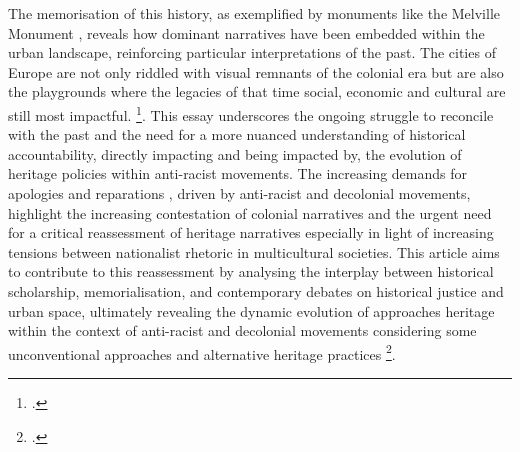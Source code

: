\documentclass{scrartcl}
\renewcommand{\cite}{\parencite}
\begin{document}
The memorisation of this history, as exemplified by monuments like the Melville Monument , reveals how dominant narratives have been embedded within the urban landscape, reinforcing particular interpretations of the past. The cities of Europe are not only riddled with visual remnants of the colonial era but are also the playgrounds where the legacies of that time social, economic and cultural are still most impactful.   \footcite["While in some cityscapes – often those of European metropoles – the challenge is to sufficiently evoke a colonial past effectively repressed or erased from the collective memory, in other cities – as is well illustrated in the article by Joffre and Shepherd on Cape Town – the echoes of past atrocities and the ghosts of individuals enslaved, abused or murdered are everywhere present." 
][p.4]{kolvraa_decolonizing_2020}. 
This essay  underscores the ongoing struggle to reconcile with the past and the need for a more nuanced understanding of historical accountability, directly impacting and being impacted by, the evolution of heritage policies within anti-racist movements.
The increasing demands for apologies and reparations \cite{hartel_2024}, driven by anti-racist and decolonial movements, highlight the increasing contestation of colonial narratives and the urgent need for a critical reassessment of heritage narratives especially in light of increasing tensions between nationalist rhetoric in multicultural societies. This article aims to contribute to this reassessment by analysing the interplay between historical scholarship, memorialisation, and contemporary debates on historical justice and urban space, ultimately revealing the dynamic evolution of approaches heritage within the context of anti-racist and decolonial movements  considering some unconventional approaches and alternative heritage practices \footcite[this would imply a rethinking of the interface between information and aesthetics in the symbolic representation of past atrocities: If – as is illustrated in the article by Knudsen and Kølvraa – colonial oppression and its present echoes must be approached not just in terms of knowledge, but also understood in terms of affects, then we need a form of heritage management that can speak to that affective dimension of collective memory. Here a more flexible and less institutionalized mode of heritage management – as we see it emerging not just from artists, but also from activists employing situationist or other aesthetic means, and from museums seeking new collaborations with artists or advocacy groups – might better serve the decolonial agenda than more traditional and rigorous didactics focusing on imparting information to the public. 
][p.4]{kolvraa_decolonizing_2020}.
\end{document}
